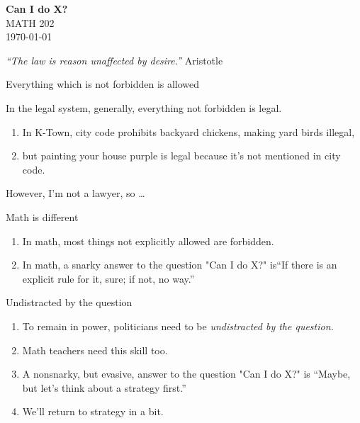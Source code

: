 \documentclass[portrait,fleqn,12pt]{beamer}
\newenvironment{handlist}
   {\begin{enumerate}[\faHandPointRight]
       \addtolength{\itemsep}{0.0\itemsep}}
     {\end{enumerate}}
\begin{document}
\begin{frame}
\begin{flushleft} 
\textbf{Can I do X?} \\
MATH 202 \\
\today 
\end{flushleft}


\emph{“The law is reason unaffected by desire.”} \hfill {\sc Aristotle } 
\end{frame}


\begin{frame}[fragile]{Everything which is not forbidden is allowed}

In the legal system, generally, everything not forbidden is legal.  

\begin{handlist}
 \item In K-Town, city code prohibits backyard chickens, making  yard birds illegal, 
 
 \item but painting your house purple is legal because it's not mentioned in city code.
 \end{handlist}
 
 However, I'm not a lawyer, so \dots
\end{frame}
 
\begin{frame}{Math is different}
 
\begin{handlist}
\item[\faHandPointRight] In math, most things not explicitly allowed are forbidden.
\item[\faHandPointRight] In math, a snarky answer to the question "Can I do X?"  is``If there is an explicit  rule for it, sure; if not, no way.''
\end{handlist}
 \vfill
\end{frame}

\begin{frame}{Undistracted by the question}

\begin{handlist}
\item To remain in power, politicians need to be \emph{undistracted by the question.}

\item Math teachers need this skill too.

\item A nonsnarky, but evasive,  answer to the question  "Can I do X?" is ``Maybe, but let's think about a strategy first.'' 

\item We'll return to strategy in a bit.
\end{handlist}
\end{frame}
\end{document}
